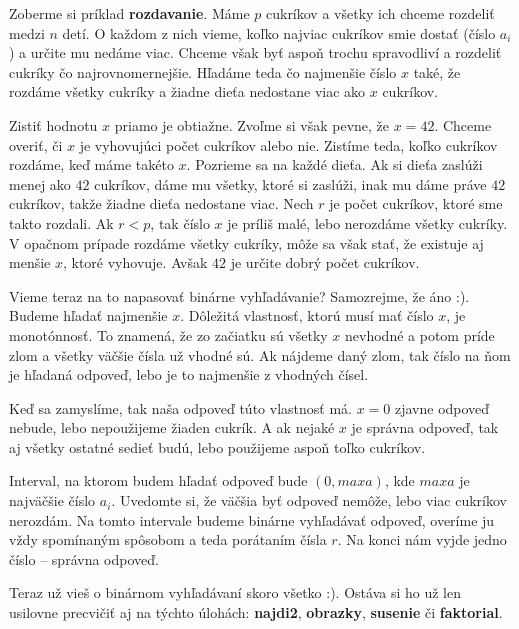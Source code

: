 Zoberme si príklad \textbf{rozdavanie}. Máme $p$ cukríkov a všetky ich chceme rozdeliť medzi $n$
detí. O každom z nich vieme, koľko najviac cukríkov smie dostať (číslo $a_i$) a určite mu nedáme
viac. Chceme však byť aspoň trochu spravodliví a rozdeliť cukríky čo najrovnomernejšie. Hľadáme teda
čo najmenšie číslo $x$ také, že rozdáme všetky cukríky a žiadne dieťa nedostane viac ako $x$ cukríkov.

Zistiť hodnotu $x$ priamo je obtiažne. Zvoľme si však pevne, že $x = 42$. Chceme overiť, či $x$ je
vyhovujúci počet cukríkov alebo nie. Zistíme teda, koľko cukríkov rozdáme, keď máme takéto $x$.
Pozrieme sa na každé dieťa. Ak si dieťa zaslúži menej ako $42$ cukríkov, dáme mu všetky, ktoré si
zaslúži, inak mu dáme práve $42$ cukríkov, takže žiadne dieťa nedostane viac. Nech $r$ je počet cukríkov,
ktoré sme takto rozdali. Ak $r < p$, tak číslo $x$ je príliš malé, lebo nerozdáme všetky cukríky. V
opačnom prípade rozdáme všetky cukríky, môže sa však stať, že existuje aj menšie $x$, ktoré
vyhovuje. Avšak $42$ je určite dobrý počet cukríkov.

Vieme teraz na to napasovať binárne vyhľadávanie? Samozrejme, že áno :). Budeme hľadať najmenšie $x$.
Dôležitá vlastnosť, ktorú musí mať číslo $x$, je monotónnosť. To znamená, že zo začiatku sú všetky
$x$ nevhodné a potom príde zlom a všetky väčšie čísla už vhodné sú. Ak nájdeme daný zlom, tak
číslo na ňom je hľadaná odpoveď, lebo je to najmenšie z vhodných čísel.

Keď sa zamyslíme, tak naša odpoveď túto vlastnosť má. $x = 0$ zjavne odpoveď nebude, lebo nepoužijeme
žiaden cukrík. A ak nejaké $x$ je správna odpoveď, tak aj všetky ostatné sedieť budú, lebo použijeme
aspoň toľko cukríkov.

Interval, na ktorom budem hľadať odpoveď bude $(0, maxa)$, kde $maxa$ je najväčšie číslo $a_i$.
Uvedomte si, že väčšia byť odpoveď nemôže, lebo viac cukríkov nerozdám. Na tomto intervale
budeme binárne vyhľadávať odpoveď, overíme ju vždy spomínaným spôsobom a teda porátaním čísla $r$.
Na konci nám vyjde jedno číslo -- správna odpoveď.

\medskip

Teraz už vieš o binárnom vyhľadávaní skoro všetko :). Ostáva si ho už len usilovne precvičiť aj na
týchto úlohách: \textbf{najdi2}, \textbf{obrazky}, \textbf{susenie} či \textbf{faktorial}.


